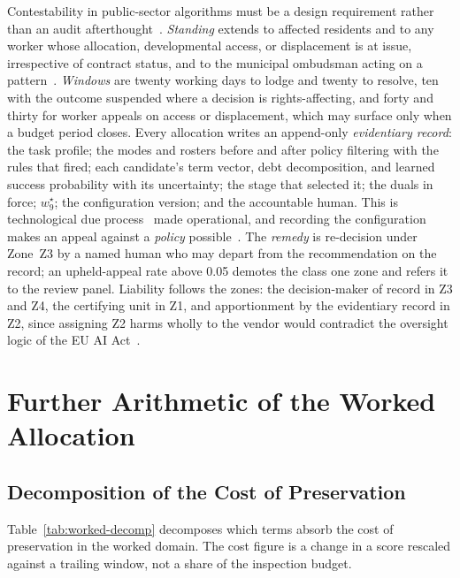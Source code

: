 \documentclass[utf8]{frontiers_suppmat}
\begin{document}
Contestability in public-sector algorithms must be a design requirement rather than an audit afterthought~\citep{MoonGuha2026,Alfrink2023}. \textit{Standing} extends to affected residents and to any worker whose allocation, developmental access, or displacement is at issue, irrespective of contract status, and to the municipal ombudsman acting on a pattern~\citep{Vaccaro2019}. \textit{Windows} are twenty working days to lodge and twenty to resolve, ten with the outcome suspended where a decision is rights-affecting, and forty and thirty for worker appeals on access or displacement, which may surface only when a budget period closes. Every allocation writes an append-only \textit{evidentiary record}: the task profile; the modes and rosters before and after policy filtering with the rules that fired; each candidate's term vector, debt decomposition, and learned success probability with its uncertainty; the stage that selected it; the duals in force; $w_9^\star$; the configuration version; and the accountable human. This is technological due process~\citep{Citron2008,CitronPasquale2014} made operational, and recording the configuration makes an appeal against a \textit{policy} possible~\citep{Almada2019}. The \textit{remedy} is re-decision under Zone~Z3 by a named human who may depart from the recommendation on the record; an upheld-appeal rate above 0.05 demotes the class one zone and refers it to the review panel. Liability follows the zones: the decision-maker of record in Z3 and Z4, the certifying unit in Z1, and apportionment by the evidentiary record in Z2, since assigning Z2 harms wholly to the vendor would contradict the oversight logic of the EU AI Act~\citep{EUAIAct2024}.

\section{Further Arithmetic of the Worked Allocation}
\label{app:worked-extra}

\subsection{Decomposition of the Cost of Preservation}
\label{app:worked-decomp}

Table~\ref{tab:worked-decomp} decomposes which terms absorb the cost of preservation in the worked domain. The cost figure is a change in a score rescaled against a trailing window, not a share of the inspection budget.
\end{document}
